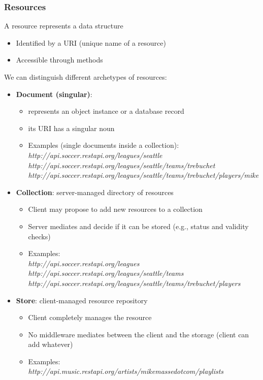 \documentclass[10pt,a4paper]{article}
\begin{document}
\subsubsection{Resources}
A resource represents a data structure
\begin{itemize}
	\item Identified by a URI (unique name of a resource)
	\item Accessible through methods
\end{itemize}
We can distinguish different archetypes of resources:
\begin{itemize}
	\item \textbf{Document (singular)}: 
	\begin{itemize}
		\item represents an object instance or a database record
		\item its URI has a singular noun
		\item Examples (single documents inside a collection):  \\
		\textit{http://api.soccer.restapi.org/leagues/seattle \\
http://api.soccer.restapi.org/leagues/seattle/teams/trebuchet \\
http://api.soccer.restapi.org/leagues/seattle/teams/trebuchet/players/mike}
	\end{itemize}	 
	\item \textbf{Collection}: server-managed directory of resources
		\begin{itemize}
			\item Client may propose to add new resources to a collection
			\item Server mediates and decide if it can be stored (e.g., status and validity checks)
			\item Examples:  \\
		\textit{http://api.soccer.restapi.org/leagues \\
http://api.soccer.restapi.org/leagues/seattle/teams \\
http://api.soccer.restapi.org/leagues/seattle/teams/trebuchet/players}
		\end{itemize}
	\item \textbf{Store}: client-managed resource repository
	\begin{itemize}
		\item Client completely manages the resource
		\item No middleware mediates between the client and the storage (client can add whatever)
		\item Examples:  \\ \textit{http://api.music.restapi.org/artists/mikemassedotcom/playlists}
	\end{itemize}
\end{itemize}
\end{document}
